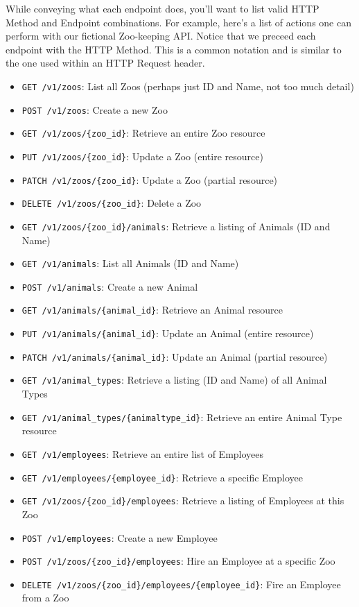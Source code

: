 \documentclass{book}
\begin{document}
While conveying what each endpoint does, you'll want to list valid HTTP Method and Endpoint combinations. For example, here's a list of actions one can perform with our fictional Zoo-keeping API. Notice that we preceed each endpoint with the HTTP Method. This is a common notation and is similar to the one used within an HTTP Request header.

\begin{itemize}
\item \texttt{GET /v1/zoos}: List all Zoos (perhaps just ID and Name, not too much detail)
\item \texttt{POST /v1/zoos}: Create a new Zoo
\item \texttt{GET /v1/zoos/\{zoo\_id\}}: Retrieve an entire Zoo resource
\item \texttt{PUT /v1/zoos/\{zoo\_id\}}: Update a Zoo (entire resource)
\item \texttt{PATCH /v1/zoos/\{zoo\_id\}}: Update a Zoo (partial resource)
\item \texttt{DELETE /v1/zoos/\{zoo\_id\}}: Delete a Zoo
\item \texttt{GET /v1/zoos/\{zoo\_id\}/animals}: Retrieve a listing of Animals (ID and Name)
\item \texttt{GET /v1/animals}: List all Animals (ID and Name)
\item \texttt{POST /v1/animals}: Create a new Animal
\item \texttt{GET /v1/animals/\{animal\_id\}}: Retrieve an Animal resource
\item \texttt{PUT /v1/animals/\{animal\_id\}}: Update an Animal (entire resource)
\item \texttt{PATCH /v1/animals/\{animal\_id\}}: Update an Animal (partial resource)
\item \texttt{GET /v1/animal\_types}: Retrieve a listing (ID and Name) of all Animal Types
\item \texttt{GET /v1/animal\_types/\{animaltype\_id\}}: Retrieve an entire Animal Type resource
\item \texttt{GET /v1/employees}: Retrieve an entire list of Employees
\item \texttt{GET /v1/employees/\{employee\_id\}}: Retrieve a specific Employee
\item \texttt{GET /v1/zoos/\{zoo\_id\}/employees}: Retrieve a listing of Employees at this Zoo
\item \texttt{POST /v1/employees}: Create a new Employee
\item \texttt{POST /v1/zoos/\{zoo\_id\}/employees}: Hire an Employee at a specific Zoo
\item \texttt{DELETE /v1/zoos/\{zoo\_id\}/employees/\{employee\_id\}}: Fire an Employee from a Zoo
\end{itemize}
\end{document}
